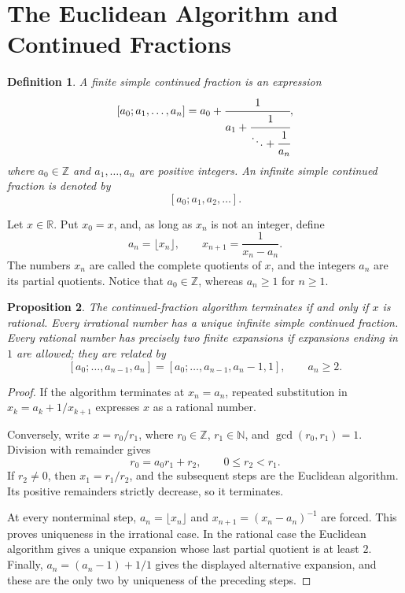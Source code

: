 \documentclass{book}
\newtheorem{definition}{Definition}[section]
\newtheorem{proposition}[definition]{Proposition}
\begin{document}
\section{The Euclidean Algorithm and Continued Fractions}

\begin{definition}
  A \textnormal{finite simple continued fraction} is an expression
  \[
    [a_0;a_1,\ldots,a_n]
    =a_0+\cfrac{1}{a_1+\cfrac{1}{\ddots+\cfrac{1}{a_n}}},
  \]
  where \(a_0\in\mathbb Z\) and \(a_1,\ldots,a_n\) are positive integers.
  An \textnormal{infinite simple continued fraction} is denoted by
  \[
    [a_0;a_1,a_2,\ldots].
  \]
\end{definition}

Let \(x\in\mathbb R\). Put \(x_0=x\), and, as long as \(x_n\) is not an
integer, define
\[
  a_n=\lfloor x_n\rfloor,
  \qquad
  x_{n+1}=\frac{1}{x_n-a_n}.
\]
The numbers \(x_n\) are called the \textnormal{complete quotients} of \(x\),
and the integers \(a_n\) are its \textnormal{partial quotients}. Notice that
\(a_0\in\mathbb Z\), whereas \(a_n\geq1\) for \(n\geq1\).

\begin{proposition}\label{prop:CFEuclideanAlgorithm}
  The continued-fraction algorithm terminates if and only if \(x\) is
  rational. Every irrational number has a unique infinite simple continued
  fraction. Every rational number has precisely two finite expansions if
  expansions ending in \(1\) are allowed; they are related by
  \[
    [a_0;\ldots,a_{n-1},a_n]
    =[a_0;\ldots,a_{n-1},a_n-1,1],
    \qquad a_n\geq2.
  \]
\end{proposition}

\begin{proof}
  If the algorithm terminates at \(x_n=a_n\), repeated substitution in
  \(x_k=a_k+1/x_{k+1}\) expresses \(x\) as a rational number.

  Conversely, write \(x=r_0/r_1\), where \(r_0\in\mathbb Z\),
  \(r_1\in\mathbb N\), and \(\gcd(r_0,r_1)=1\). Division with remainder gives
  \[
    r_0=a_0r_1+r_2,\qquad 0\leq r_2<r_1.
  \]
  If \(r_2\neq0\), then \(x_1=r_1/r_2\), and the subsequent steps are the
  Euclidean algorithm. Its positive remainders strictly decrease, so it
  terminates.

  At every nonterminal step, \(a_n=\lfloor x_n\rfloor\) and
  \(x_{n+1}=(x_n-a_n)^{-1}\) are forced. This proves uniqueness in the
  irrational case. In the rational case the Euclidean algorithm gives a
  unique expansion whose last partial quotient is at least \(2\). Finally,
  \(a_n=(a_n-1)+1/1\) gives the displayed alternative expansion, and these
  are the only two by uniqueness of the preceding steps.
\end{proof}
\end{document}
